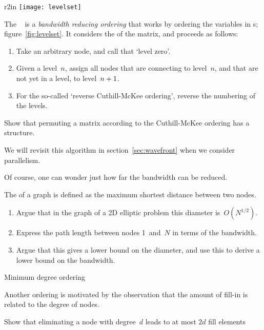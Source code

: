 \begin{wrapfigure}{r}{2in}
  \texttt{[image: levelset]}
  \caption{Level sets.}
  \label{fig:levelset}
\end{wrapfigure}
%
The ~\cite{CuMcK:reducing}
is a \emph{bandwidth reducing ordering}
that works by ordering
the variables in s; figure~\ref{fig:levelset}.
It considers the
 of the matrix, and proceeds as
follows:
\begin{enumerate}
\item Take an arbitrary node, and call that `level zero'.
\item Given a level~$n$, assign all nodes that are connecting to
  level~$n$, and that are not yet in a level, to
  level~$n+\nobreak1$.
\item For the so-called `reverse Cuthill-McKee ordering', reverse the
  numbering of the levels.
\end{enumerate}
\begin{exercise}
  Show that permuting a matrix according to the Cuthill-McKee ordering
  has a  structure.
\end{exercise}
We will revisit this algorithm in section~\ref{sec:wavefront} when we
consider parallelism.

Of course, one can wonder just how far the bandwidth can be reduced.
\begin{exercise}
  The  of a graph is defined as the maximum
  shortest distance between two nodes.
  \begin{enumerate}
  \item Argue that in the graph of a 2D elliptic problem this diameter
    is~$O(N^{1/2})$.
  \item Express the path length between nodes 1~and~$N$ in terms of
    the bandwidth.
  \item Argue that this gives a lower bound on the diameter, and use
    this to derive a lower bound on the bandwidth.
  \end{enumerate}
\end{exercise}

 {Minimum degree ordering}

Another ordering is motivated by the observation that the amount of
fill-in is related to the degree of nodes.
\begin{exercise}
  Show that eliminating a node with degree~$d$ leads to at most $2d$
  fill elements
\end{exercise}

